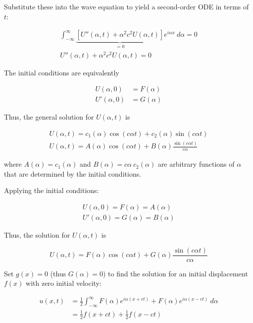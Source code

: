 \vsp

Substitute these into the wave equation to yield a second-order ODE in terms of $t$:

\begin{align*}
    \int_{-\infty}^\infty \underbrace{\left[U''(\alpha,t) + \alpha^2 c^2 U(\alpha,t) \right]}_{=0} e^{i\alpha x}~d\alpha = 0 \\
    U''(\alpha,t) + \alpha^2 c^2 U(\alpha,t) = 0
\end{align*}

The initial conditions are equivalently

\begin{align*}
    U(\alpha,0)  & = F(\alpha) \\
    U'(\alpha,0) & = G(\alpha)
\end{align*}

\vsp

Thus, the general solution for $U(\alpha,t)$ is

\begin{align*}
    U(\alpha,t) = c_1(\alpha)\cos(c\alpha t) + c_2(\alpha)\sin(c\alpha t) \\
    U(\alpha,t) = A(\alpha)\cos(c\alpha t) + B(\alpha)\frac{\sin(c\alpha t)}{c\alpha}
\end{align*}

\vsp

where $A(\alpha) = c_1(\alpha)$ and $B(\alpha) = c\alpha~c_2(\alpha)$ are arbitrary functions of $\alpha$ that are determined by the initial conditions.

\vsp

Applying the initial conditions:

\begin{align*}
    U(\alpha,0) = F(\alpha) = A(\alpha) \\
    U'(\alpha,0) = G(\alpha) = B(\alpha)
\end{align*}

\vsp

Thus, the solution for $U(\alpha,t)$ is

\begin{equation*}
    U(\alpha,t) = F(\alpha)\cos(c\alpha t) + G(\alpha)\frac{\sin(c\alpha t)}{c\alpha}
\end{equation*}

\vsp

Set $g(x) = 0$ (thus $G(\alpha) = 0$) to find the solution for an initial displacement $f(x)$ with zero initial velocity:

\begin{align*}
    u(x,t) & = \frac{1}{2}\int_{-\infty}^\infty F(\alpha) e^{i\alpha(x+ct)} + F(\alpha) e^{i\alpha(x-ct)}~d\alpha \\
           & = \frac{1}{2} f(x + ct) + \frac{1}{2} f(x - ct)
\end{align*}

